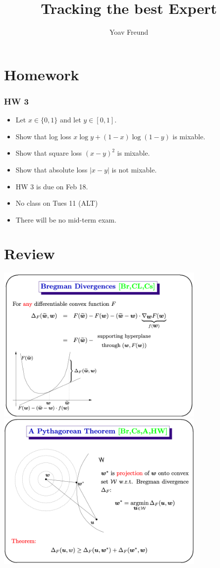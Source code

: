 \documentclass[handout]{beamer}
\title %
{Tracking the best Expert}
\author[Freund] %
{Yoav Freund}
\institute[Universities of Somewhere and Elsewhere] %
\begin{document}
%


\begin{frame}
  \titlepage
\end{frame}
\section{Homework}
\begin{frame}
\frametitle{HW 3} 
\begin{itemize}
\item Let $x \in \{0,1\}$ and let $y \in[0,1]$.
\item Show that log loss $x \log y + (1-x)\log(1-y)$ is mixable.
\item Show that square loss $(x-y)^2$ is mixable.
\item Show that absolute loss $|x-y|$ is not mixable.
\item HW 3 is due on Feb 18.
\item No class on Tues 11 (ALT)
\item There will be no mid-term exam.
\end{itemize}
\end{frame}

\section{Review}
\includegraphics[width=4in]{ManfredSlides/skitch9.png}\\
\includegraphics[width=4in]{ManfredSlides/skitch6.png}
\end{document}
